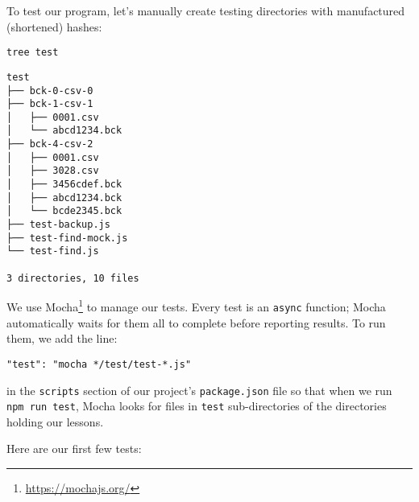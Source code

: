 \documentclass[krantzl]{krantz}
\newcommand{\hreffoot}[2]{{#1}\footnote{\href{#2}{#2}}}
\begin{document}
To test our program,
let’s manually create testing directories with manufactured (shortened) hashes:


\begin{lstlisting}[frame=shadowbox]
tree test
\end{lstlisting}



\begin{lstlisting}[frame=tblr,backgroundcolor=\color{black!5}]
test
├── bck-0-csv-0
├── bck-1-csv-1
│   ├── 0001.csv
│   └── abcd1234.bck
├── bck-4-csv-2
│   ├── 0001.csv
│   ├── 3028.csv
│   ├── 3456cdef.bck
│   ├── abcd1234.bck
│   └── bcde2345.bck
├── test-backup.js
├── test-find-mock.js
└── test-find.js

3 directories, 10 files
\end{lstlisting}



We use \hreffoot{Mocha}{https://mochajs.org/} to manage our tests.
Every test is an \texttt{async} function;
Mocha automatically waits for them all to complete before reporting results.
To run them,
we add the line:

\begin{lstlisting}[frame=tblr]
"test": "mocha */test/test-*.js"
\end{lstlisting}


\noindent in the \texttt{scripts} section of our project’s \texttt{package.json} file
so that when we run \texttt{npm run test},
Mocha looks for files in \texttt{test} sub-directories of the directories holding our lessons.


Here are our first few tests:
\end{document}
